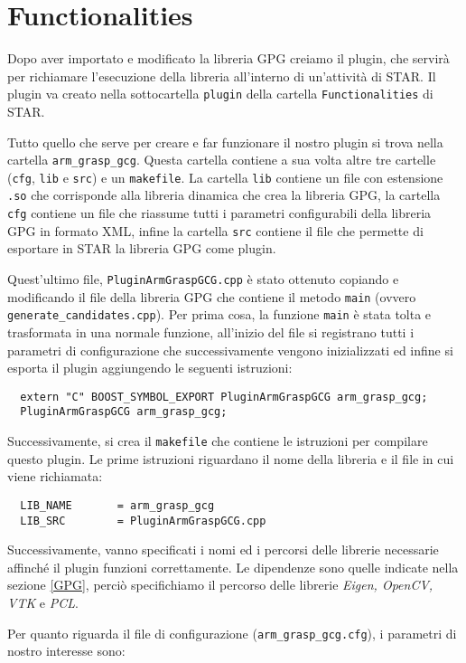 \documentclass{report}
\begin{document}
\section{Functionalities}
Dopo aver importato e modificato la libreria GPG creiamo il plugin, che servirà per richiamare l'esecuzione della libreria all'interno di un'attività di STAR. Il plugin va creato nella sottocartella \texttt{plugin} della cartella \texttt{Functionalities} di STAR. \par
Tutto quello che serve per creare e far funzionare il nostro plugin si trova nella cartella \texttt{arm\_grasp\_gcg}. Questa cartella contiene a sua volta altre tre cartelle (\texttt{cfg}, \texttt{lib} e \texttt{src}) e un \texttt{makefile}. La cartella \texttt{lib} contiene un file con estensione \texttt{.so} che corrisponde alla libreria dinamica che crea la libreria GPG, la cartella \texttt{cfg} contiene un file che riassume tutti i parametri configurabili della libreria GPG in formato XML, infine la cartella \texttt{src} contiene il file che permette di esportare in STAR la libreria GPG come plugin. \par
Quest'ultimo file, \texttt{PluginArmGraspGCG.cpp} è stato ottenuto copiando e modificando il file della libreria GPG che contiene il metodo \texttt{main} (ovvero \texttt{generate\_candidates.cpp}). Per prima cosa, la funzione \texttt{main} è stata tolta e trasformata in una normale funzione, all'inizio del file si registrano tutti i parametri di configurazione che successivamente vengono inizializzati ed infine si esporta il plugin aggiungendo le seguenti istruzioni: 
\begin{verbatim}
  extern "C" BOOST_SYMBOL_EXPORT PluginArmGraspGCG arm_grasp_gcg;
  PluginArmGraspGCG arm_grasp_gcg;
\end{verbatim}
\indent Successivamente, si crea il \texttt{makefile} che contiene le istruzioni per compilare questo plugin. Le prime istruzioni riguardano il nome della libreria e il file in cui viene richiamata:
\begin{verbatim}
  LIB_NAME       = arm_grasp_gcg
  LIB_SRC        = PluginArmGraspGCG.cpp
\end{verbatim} 
Successivamente, vanno specificati i nomi ed i percorsi delle librerie necessarie affinché il plugin funzioni correttamente. Le dipendenze sono quelle indicate nella sezione \ref{GPG}, perciò specifichiamo il percorso delle librerie \textit{Eigen, OpenCV, VTK} e \textit{PCL}. \par
Per quanto riguarda il file di configurazione (\texttt{arm\_grasp\_gcg.cfg}), i parametri di nostro interesse sono:
\end{document}

